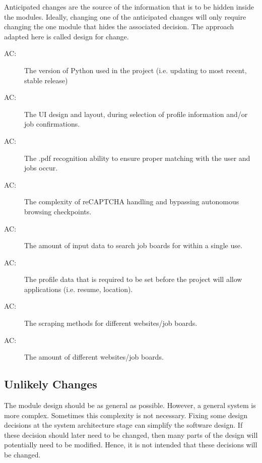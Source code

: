 \documentclass[12pt, titlepage]{article}
\newcounter{acnum}
\newcommand{\actheacnum}{AC\theacnum}
\begin{document}
Anticipated changes are the source of the information that is to be hidden
inside the modules. Ideally, changing one of the anticipated changes will only
require changing the one module that hides the associated decision. The approach
adapted here is called design for
change.

\begin{description}
\item[ \actheacnum \label{acHardware}:] The version of Python used in the project (i.e. updating to most recent, stable release)
\item[ \actheacnum \label{acUI}:] 
The UI design and layout, during selection of profile information and/or job confirmations.
\item[ \actheacnum \label{acPDF}:] 
The .pdf recognition ability to ensure proper matching with the user and jobs occur.
\item[ \actheacnum \label{acCAPTCHA}:] 
The complexity of reCAPTCHA handling and bypassing autonomous browsing checkpoints.
\item[ \actheacnum \label{acDataAm}:] 
The amount of input data to search job boards for within a single use.
\item[ \actheacnum \label{acDataReq}:] 
The profile data that is required to be set before the project will allow applications (i.e. resume, location).
\item[ \actheacnum \label{acScrape}:] 
The scraping methods for different websites/job boards.
\item[ \actheacnum \label{acSites}:] 
The amount of different websites/job boards.

\end{description}

\subsection{Unlikely Changes} \label{SecUchange}

The module design should be as general as possible. However, a general system is
more complex. Sometimes this complexity is not necessary. Fixing some design
decisions at the system architecture stage can simplify the software design. If
these decision should later need to be changed, then many parts of the design
will potentially need to be modified. Hence, it is not intended that these
decisions will be changed.
\end{document}
